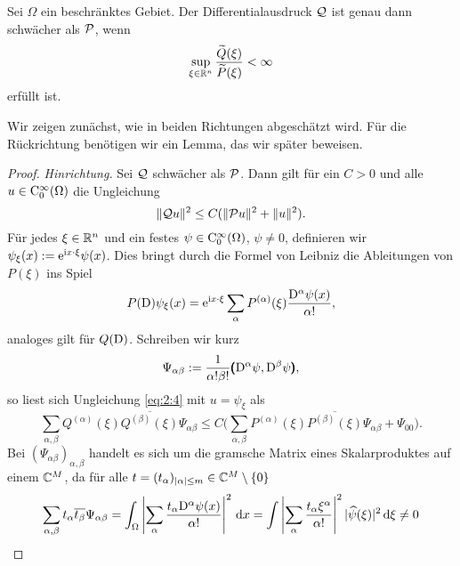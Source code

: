 \begin{thm}\label{thm:2:2.1}
Sei $\Omega$ ein beschränktes Gebiet.
Der Differentialausdruck $\mathcal Q$ ist genau dann schwächer als $\mathcal P$,
wenn
\begin{equation}\label{eq:thm:2:2.1}
\sup_{\xi\in\mathbb R^n}\frac{\widetilde{Q}(\xi)}{\widetilde{P}(\xi)}<\infty
\end{equation}
erfüllt ist.
\end{thm}

Wir zeigen zunächst, wie in beiden Richtungen abgeschätzt wird.
Für die Rückrichtung benötigen wir ein Lemma,
das wir später beweisen.

\begin{proof}
{\em Hinrichtung.}
Sei $\mathcal Q$ schwächer als $\mathcal P$.
Dann gilt für ein $C>0$ und alle $u\in\mathrm C_0^\infty(\Omega)$ die Ungleichung
\begin{equation}\label{eq:2:4}
\lVert\mathcal Q u\rVert^2\leq C(\lVert\mathcal P u\rVert^2+\lVert u\rVert^2).
\end{equation}
Für jedes $\xi\in\mathbb R^n$ und ein festes $\psi\in \mathrm C^\infty_0(\Omega)$, $\psi\neq0$,
definieren wir $\psi_\xi(x):=\mathrm e^{\mathrm i x\cdot\xi}\psi(x)$.
Dies bringt durch die Formel von Leibniz die Ableitungen von $P(\xi)$ ins Spiel
\begin{equation}\label{eq:2.5}
P(\mathrm D)\psi_\xi(x)=\mathrm e^{\mathrm i x\cdot\xi}\sum_\alpha P^{(\alpha)}(\xi)\frac{\mathrm D^\alpha\psi(x)}{\alpha!},
\end{equation}
analoges gilt für $Q(\mathrm D)$.
Schreiben wir kurz
\begin{equation}\label{eq:2.6}
\Psi_{\alpha\beta}:=\frac1{\alpha!\beta!}\pmb(\mathrm D^\alpha\psi,\mathrm D^\beta\psi\pmb),
\end{equation}
so liest sich Ungleichung \eqref{eq:2:4} mit $u=\psi_\xi$ als
\begin{equation}\label{eq:2.7}
\sum_{\alpha,\beta}Q^{(\alpha)}(\xi)\overline{{Q}^{(\beta)}(\xi)}\Psi_{\alpha\beta}
\leq C\bigg(\sum_{\alpha,\beta}P^{(\alpha)}(\xi)\overline{{P}^{(\beta)}(\xi)}\Psi_{\alpha\beta}+\Psi_{00}\bigg).
\end{equation}
Bei $\left(\Psi_{\alpha\beta}\right)_{\alpha,\beta}$ handelt es sich um die gramsche Matrix
eines Skalarproduktes auf einem $\mathbb C^M$, da für alle $t=(t_\alpha)_{|\alpha|\le m}\in\mathbb C^M\setminus\{0\}$
\begin{equation}
  \sum_{\alpha,\beta} t_\alpha \overline{t_\beta} \Psi_{\alpha\beta} = \int_\Omega \left|\sum_\alpha \frac{t_\alpha \D^\alpha\psi (x)}{\alpha! }\right|^2 \d x 
  = \int \left|\sum_\alpha \frac{t_\alpha \xi^\alpha}{\alpha!} \right|^2 |\widehat\psi(\xi)|^2 \d\xi \ne0

\end{equation}
\end{proof}
